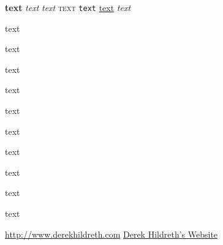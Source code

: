 \textbf{text} %
\textit{text} %
\textsl{text} %
\textsc{text} %
\texttt{text} %
\underline{text} %
\emph{text} %

\begin{tiny}text\end{tiny} %
\begin{scriptsize}text\end{scriptsize} %
\begin{footnotesize}text\end{footnotesize} %
\begin{small}text\end{small} %
\begin{normalsize}text\end{normalsize} %
\begin{large}text\end{large} %
\begin{Large}text\end{Large} %
\begin{LARGE}text\end{LARGE} %
\begin{huge}text\end{huge}   %
\begin{Huge}text\end{Huge}   %


\tableofcontents
\listoffigures
\listoftables

\url{http://www.derekhildreth.com}
\href{http://www.derekhildreth.com}{Derek Hildreth's Website}

